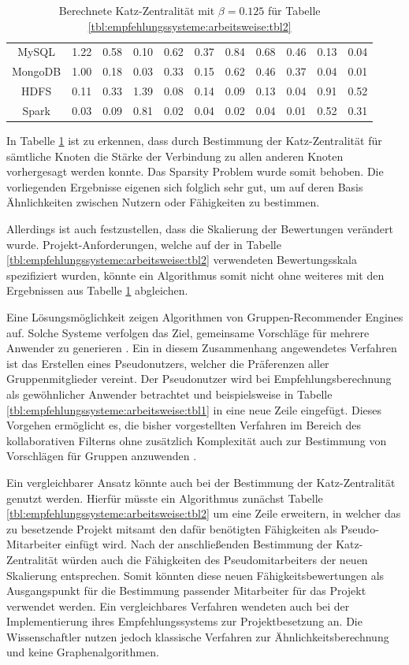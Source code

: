 \begin{table}[h]
\begin{tabular}{c|c|c|c|c|c|c|c|c|c|c}
		MySQL    & 1.22 & 0.58 & 0.10 & 0.62 & 0.37 & 0.84 & 0.68 & 0.46 & 0.13 & 0.04\\
		MongoDB  & 1.00 & 0.18 & 0.03 & 0.33 & 0.15 & 0.62 & 0.46 & 0.37 & 0.04 & 0.01\\
		HDFS     & 0.11 & 0.33 & 1.39 & 0.08 & 0.14 & 0.09 & 0.13 & 0.04 & 0.91 & 0.52\\
		Spark    & 0.03 & 0.09 & 0.81 & 0.02 & 0.04 & 0.02 & 0.04 & 0.01 & 0.52 & 0.31
	\end{tabular}
	\caption{Berechnete Katz-Zentralität mit $\beta = 0.125$ für Tabelle \ref{tbl:empfehlungssysteme:arbeitsweise:tbl2}}
	\label{tbl:empfehlungssysteme:arbeitsweise:tbl3}
\end{table}

In Tabelle \ref{tbl:empfehlungssysteme:arbeitsweise:tbl3} ist zu erkennen, dass durch Bestimmung der Katz-Zentralität für sämtliche Knoten die Stärke der Verbindung zu allen anderen Knoten vorhergesagt werden konnte. Das Sparsity Problem wurde somit behoben. Die vorliegenden Ergebnisse eigenen sich folglich sehr gut, um auf deren Basis Ähnlichkeiten zwischen Nutzern oder Fähigkeiten zu bestimmen.

Allerdings ist auch festzustellen, dass die Skalierung der Bewertungen verändert wurde. Projekt-Anforderungen, welche auf der in Tabelle \ref{tbl:empfehlungssysteme:arbeitsweise:tbl2} verwendeten Bewertungsskala spezifiziert wurden, könnte ein Algorithmus somit nicht ohne weiteres mit den Ergebnissen aus Tabelle \ref{tbl:empfehlungssysteme:arbeitsweise:tbl3} abgleichen.

Eine Lösungsmöglichkeit zeigen Algorithmen von Gruppen-Recommender Engines auf. Solche Systeme verfolgen das Ziel, gemeinsame Vorschläge für mehrere Anwender zu generieren \cite[S. 1]{dara:2020}. Ein in diesem Zusammenhang angewendetes Verfahren ist das Erstellen eines Pseudonutzers, welcher die Präferenzen aller Gruppenmitglieder vereint. Der Pseudonutzer wird bei Empfehlungsberechnung als gewöhnlicher Anwender betrachtet und beispielsweise in Tabelle \ref{tbl:empfehlungssysteme:arbeitsweise:tbl1} in eine neue Zeile eingefügt. Dieses Vorgehen ermöglicht es, die bisher vorgestellten Verfahren im Bereich des kollaborativen Filterns ohne zusätzlich Komplexität auch zur Bestimmung von Vorschlägen für Gruppen anzuwenden \cite[S. 8f.]{oconnor:2001}.

Ein vergleichbarer Ansatz könnte auch bei der Bestimmung der Katz-Zentralität genutzt werden. Hierfür müsste ein Algorithmus zunächst Tabelle \ref{tbl:empfehlungssysteme:arbeitsweise:tbl2} um eine Zeile erweitern, in welcher das zu besetzende Projekt mitsamt den dafür benötigten Fähigkeiten als Pseudo-Mitarbeiter einfügt wird. Nach der anschließenden Bestimmung der Katz-Zentralität würden auch die Fähigkeiten des Pseudomitarbeiters der neuen Skalierung entsprechen. Somit könnten diese neuen Fähigkeitsbewertungen als Ausgangspunkt für die Bestimmung passender Mitarbeiter für das Projekt verwendet werden. Ein vergleichbares Verfahren wendeten auch \textcite[S. 2]{mitre:2014} bei der Implementierung ihres Empfehlungssystems zur Projektbesetzung an. Die Wissenschaftler nutzen jedoch klassische Verfahren zur Ähnlichkeitsberechnung und keine Graphenalgorithmen.

